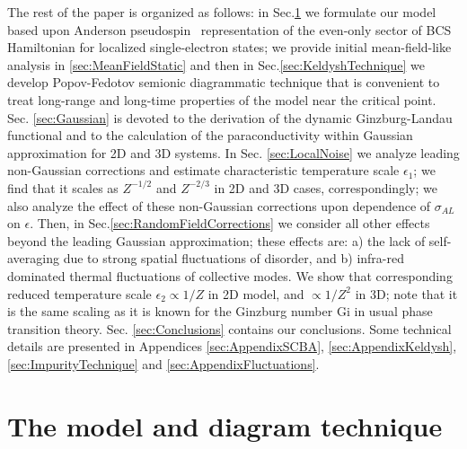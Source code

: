 \documentclass[twocolumn,english,prb]{revtex4-1}
\begin{document}
The rest of the paper is organized as follows: in Sec.\ref{sec:Model} we formulate our model based upon Anderson pseudospin~
\cite{AndersonPseudo} representation of the even-only sector of BCS Hamiltonian for localized single-electron states; we
provide initial mean-field-like analysis in \ref{sec:MeanFieldStatic} and then in  Sec.\ref{sec:KeldyshTechnique} 
 we develop Popov-Fedotov semionic diagrammatic technique that is convenient to treat long-range and long-time 
properties of the model near the critical
point.  Sec. \ref{sec:Gaussian} is devoted to the derivation of the dynamic Ginzburg-Landau functional and to the calculation of the paraconductivity within Gaussian approximation for 2D and 3D systems. In Sec. \ref{sec:LocalNoise} we analyze leading non-Gaussian
corrections and estimate characteristic temperature scale $\epsilon_1$; we find that it scales as $Z^{-1/2}$ and
$Z^{-2/3}$ in 2D and 3D cases, correspondingly; we also analyze the effect of these non-Gaussian corrections upon
dependence of $\sigma_{AL}$ on $\epsilon$. Then, in Sec.\ref{sec:RandomFieldCorrections} we consider all other effects beyond the leading
Gaussian approximation; these effects are:  a) the lack of self-averaging due to strong spatial fluctuations 
of disorder, and b) infra-red dominated thermal fluctuations of collective modes. We show that corresponding
reduced temperature scale $\epsilon_2 \propto 1/Z$ in 2D model, and $\propto 1/Z^2$ in 3D; note that it is the
same scaling as it is known for  the Ginzburg number $\mathrm{Gi}$ in usual phase transition theory.
 Sec. \ref{sec:Conclusions} contains our conclusions.
Some technical details are presented in Appendices \ref{sec:AppendixSCBA},
\ref{sec:AppendixKeldysh}, \ref{sec:ImpurityTechnique} and \ref{sec:AppendixFluctuations}.









\section{The model and diagram technique}
\label{sec:Model}
\end{document}
